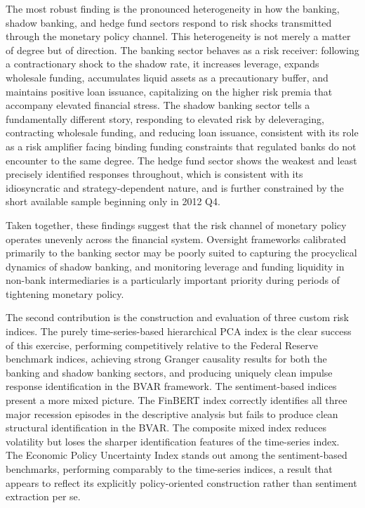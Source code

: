 \documentclass[12pt,a4paper]{report}
\begin{document}
The most robust finding is the pronounced heterogeneity in how the banking, shadow banking, and hedge fund sectors respond to risk shocks transmitted through the monetary policy channel. This heterogeneity is not merely a matter of degree but of direction. The banking sector behaves as a risk receiver: following a contractionary shock to the shadow rate, it increases leverage, expands wholesale funding, accumulates liquid assets as a precautionary buffer, and maintains positive loan issuance, capitalizing on the higher risk premia that accompany elevated financial stress. The shadow banking sector tells a fundamentally different story, responding to elevated risk by deleveraging, contracting wholesale funding, and reducing loan issuance, consistent with its role as a risk amplifier facing binding funding constraints that regulated banks do not encounter to the same degree. The hedge fund sector shows the weakest and least precisely identified responses throughout, which is consistent with its idiosyncratic and strategy-dependent nature, and is further constrained by the short available sample beginning only in 2012 Q4.

Taken together, these findings suggest that the risk channel of monetary policy operates unevenly across the financial system. Oversight frameworks calibrated primarily to the banking sector may be poorly suited to capturing the procyclical dynamics of shadow banking, and monitoring leverage and funding liquidity in non-bank intermediaries is a particularly important priority during periods of tightening monetary policy.

The second contribution is the construction and evaluation of three custom risk indices. The purely time-series-based hierarchical PCA index is the clear success of this exercise, performing competitively relative to the Federal Reserve benchmark indices, achieving strong Granger causality results for both the banking and shadow banking sectors, and producing uniquely clean impulse response identification in the BVAR framework. The sentiment-based indices present a more mixed picture. The FinBERT index correctly identifies all three major recession episodes in the descriptive analysis but fails to produce clean structural identification in the BVAR. The composite mixed index reduces volatility but loses the sharper identification features of the time-series index. The Economic Policy Uncertainty Index stands out among the sentiment-based benchmarks, performing comparably to the time-series indices, a result that appears to reflect its explicitly policy-oriented construction rather than sentiment extraction per se.
\end{document}
